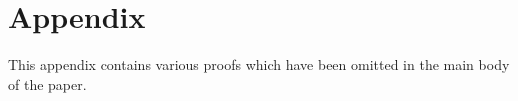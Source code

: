 \documentclass[11pt,english]{article}
\numberwithin{equation}{section}
\newtheorem{lemma}{Lemma}[section]
\theoremstyle{remark}
\theoremstyle{plain}
\theoremstyle{remark}
\newcommand{\dd}{\mathop{}\!\mathrm{d}}
\newcommand{\pv}{\partial_v}
\renewcommand{\(}{\left(}
\renewcommand{\)}{\right)}
\begin{document}
\begin{comment}
\end{proof}
Finally, we state the following simple fact:
\begin{lemma}
Let $\hat \phi(u,\Omega)$ be a smooth initial data for the wave equation \eqref{waveequation} on $\mathcal{M}\cap\{v=v_1\}$ which satisfies for all $u\leq u_2<0$:
\begin{align}
|r\hat\phi(u,\Omega)|, |\slashed{\nabla}_{\mathbb S^2}r\hat\phi(u,\Omega)|=\mathcal{O}_{\infty}\left(\frac{1}{|u|^{L-1+\epsilon}}\right)
\end{align}
for some $L\in\mathbb{N}$. 
If we define $\pv \hat\phi$ via
\begin{equation}
\pv(r\hat \phi)=\int_{-\infty}^u -\frac{2D}{r^3}r\hat\phi+\frac{D}{r^2}\slashed\Delta_{\mathbb{S}^2}r\hat\phi \dd u'
\end{equation}
and inductively define $\pv^n\hat\phi$ from this in the obvious way, then there exists another constant $C$ and $p\in(1,2)$ such that the energy term
\begin{multline}
\sum_{j=0}^{L-1}\int\limits_{v=v_1}r^{p-2}\left(\left([r^2\pv]^j(r\hat\phi)\right)^2+\left(\slashed{\nabla}_{\mathbb S^2}[r^2\pv]^{j}(r \hat\phi)\right)^2\right)\dd \Omega\dd u,\\
+\int\limits_{v=v_1}r^{p-3}\left([r^2\pv]^L(r\hat\phi)\right)^2\dd \Omega\dd u
\end{multline}
remains finite.
\end{lemma}
\end{comment}







\appendix
\section{Appendix}\label{sec:app}
This appendix contains various proofs which have been omitted in the main body of the paper.
\end{document}
